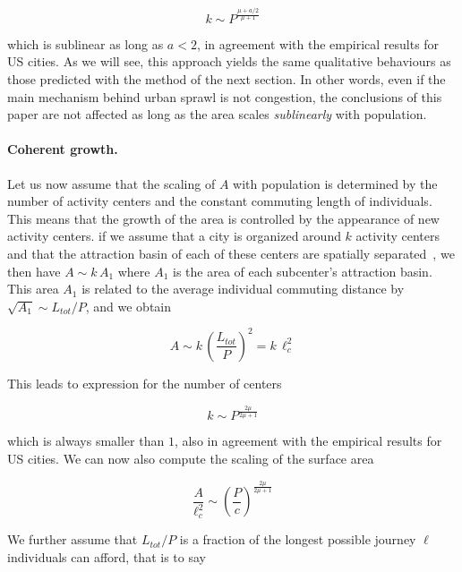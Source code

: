 \begin{equation}
    k \sim P^{\frac{\mu + a/2}{\mu+1}}
\end{equation}

which is sublinear as long as $a<2$, in agreement with the empirical results for
US cities. As we will see, this approach yields the same qualitative behaviours
as those predicted with the method of the next section. In other words, even if
the main mechanism behind urban sprawl is not congestion, the conclusions of
this paper are not affected as long as the area scales \emph{sublinearly} with
population.\\


\paragraph{Coherent growth.}

Let us now assume that the scaling of $A$ with population is determined by the
number of activity centers and the constant commuting length of individuals.
This means that the growth of the area is controlled by the appearance of new
activity centers. if we assume that a city is organized around $k$ activity
centers and that the attraction basin of each of these centers are spatially
separated~\cite{Louf:2013_polycentric}, we then have  $A \sim k\, A_1$ where $A_1$ is the
area of each subcenter's attraction basin. This area $A_1$ is related to the
average individual commuting distance by $\sqrt{A_1} \sim L_{tot} / P$, and we
obtain

\begin{equation}
    A \sim k\,  \left( \frac{L_{tot}}{P} \right)^2 = k\, \ell_c^2
    \label{eq:area_poly}
\end{equation}

This leads to expression for the number of centers

\begin{equation}
    k \sim P^{\frac{2 \mu}{2\mu+1}}
\end{equation}

which is always smaller than $1$, also in agreement with the empirical results
for US cities. We can now also compute the scaling of the surface area

\begin{equation}
    \frac{A}{\ell_c^2} \sim \left( \frac{P}{c} \right)^{\frac{2 \mu}{2\mu+1}}
\end{equation}

We further assume that $L_{tot} / P$ is a fraction of the longest possible
journey $\ell$ individuals can afford, that is to say 


